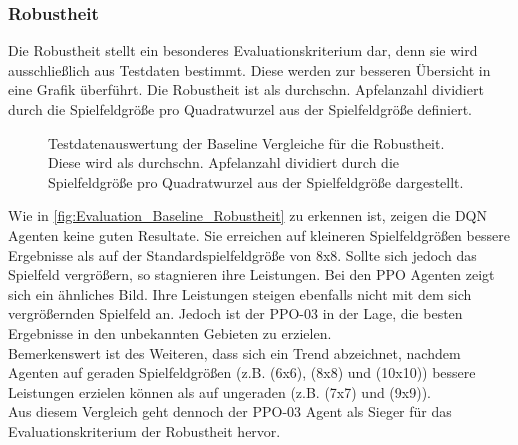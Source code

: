 \subsubsection{Robustheit} \label{subsubsec:Evaluation_Robustheit}
Die Robustheit stellt ein besonderes Evaluationskriterium dar, denn sie wird ausschließlich aus Testdaten bestimmt. Diese werden zur besseren Übersicht in eine Grafik überführt. Die Robustheit ist als durchschn. Apfelanzahl dividiert durch die Spielfeldgröße pro Quadratwurzel aus der Spielfeldgröße definiert. 
\begin{figure}[H]
	\centering
	
	\caption[Robustheit - Auswertung der Testdaten der Baseline Vergleiche]{Testdatenauswertung der Baseline Vergleiche für die Robustheit. Diese wird als durchschn. Apfelanzahl dividiert durch die Spielfeldgröße pro Quadratwurzel aus der Spielfeldgröße dargestellt.}
	\label{fig:Evaluation_Baseline_Robustheit}
\end{figure}
Wie in \autoref{fig:Evaluation_Baseline_Robustheit} zu erkennen ist, zeigen die DQN Agenten keine guten Resultate.
Sie erreichen auf kleineren Spielfeldgrößen bessere Ergebnisse als auf der Standardspielfeldgröße von 8x8. Sollte sich jedoch das Spielfeld vergrößern, so stagnieren ihre Leistungen.
Bei den PPO Agenten zeigt sich ein ähnliches Bild. Ihre Leistungen steigen ebenfalls nicht mit dem sich vergrößernden Spielfeld an. Jedoch ist der PPO-03 in der Lage, die besten Ergebnisse in den unbekannten Gebieten zu erzielen.\\
Bemerkenswert ist des Weiteren, dass sich ein Trend abzeichnet, nachdem Agenten auf geraden Spielfeldgrößen (z.B. (6x6), (8x8) und (10x10)) bessere Leistungen erzielen können als auf ungeraden (z.B. (7x7) und (9x9)).\\
Aus diesem Vergleich geht dennoch der PPO-03 Agent als Sieger für das Evaluationskriterium der Robustheit hervor.

